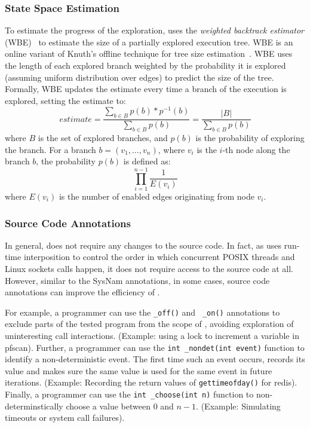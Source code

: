 \subsubsection{State Space Estimation}
To estimate the progress of the exploration, \dbug uses the
\emph{weighted backtrack estimator} (WBE)~\cite{Kilby2006} to estimate
the size of a partially explored execution tree. WBE is an online
variant of Knuth's offline technique for tree size
estimation~\cite{Knuth1975}. WBE uses the length of each explored branch
weighted by the probability it is explored (assuming uniform
distribution over edges) to predict the size of the tree. Formally,
WBE updates the estimate every time a branch of the execution is
explored, setting the estimate to:
\[
\mathit{estimate} =
\frac{\sum\limits_{b \in B} p(b) * p^{-1}(b)}{\sum\limits_{b \in B} p(b)} =
\frac{|B|}{\sum\limits_{b \in B} p(b)}
\]
where $B$ is the set of explored branches, and $p(b)$ is the
probability of exploring the branch. For a branch $b = (v_1, \ldots,                                                                                          
v_n)$, where $v_i$ is the $i$-th node along the branch $b$, the
probability $p(b)$ is defined as: \[\prod\limits_{i = 1}^{n - 1}
\frac{1}{E(v_i)}\] where $E(v_i)$ is the number of enabled
edges originating from node $v_i$.

\subsubsection{Source Code Annotations}
In general, \dbug does not require any changes to the source code. In
fact, as \dbug uses run-time interposition to control the order in
which concurrent POSIX threads and Linux sockets calls happen, it does
not require access to the source code at all.  However, similar to the
SysNam annotations, in some cases, source code annotations can improve
the efficiency of \dbug.

For example, a programmer can use the {\tt \dbug\_off()} and {\tt
  \dbug\_on()} annotations to exclude parts of the tested program from
the scope of \dbug, avoiding exploration of uninteresting call
interactions. (Example: using a lock to increment a variable in
pfscan). Further, a programmer can use the {\tt int \dbug\_nondet(int
  event)} function to identify a non-deterministic event. The first
time such an event occurs, \dbug records its value and makes sure the
same value is used for the same event in future iterations. (Example:
Recording the return values of {\tt gettimeofday()} for redis).
Finally, a programmer can use the {\tt int \dbug\_choose(int n)}
function to non-determinstically choose a value between $0$ and
$n-1$. (Example: Simulating timeouts or system call failures).
